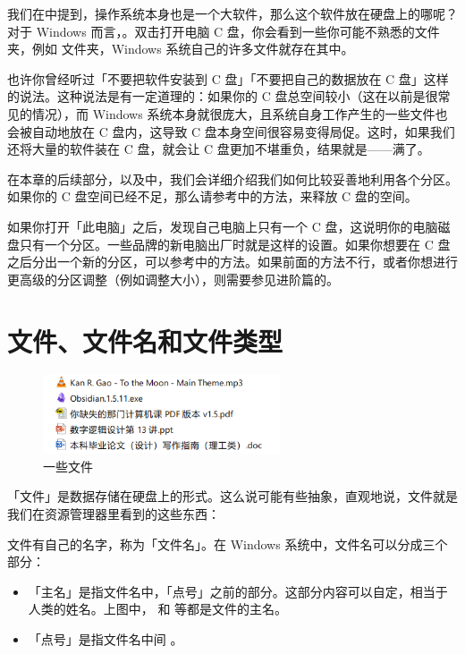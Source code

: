 我们在中提到，操作系统本身也是一个大软件，那么这个软件放在硬盘上的哪呢？对于 Windows 而言，。双击打开电脑 C 盘，你会看到一些你可能不熟悉的文件夹，例如  文件夹，Windows 系统自己的许多文件就存在其中。

也许你曾经听过「不要把软件安装到 C 盘」「不要把自己的数据放在 C 盘」这样的说法。这种说法是有一定道理的：如果你的 C 盘总空间较小（这在以前是很常见的情况），而 Windows 系统本身就很庞大，且系统自身工作产生的一些文件也会被自动地放在 C 盘内，这导致 C 盘本身空间很容易变得局促。这时，如果我们还将大量的软件装在 C 盘，就会让 C 盘更加不堪重负，结果就是——满了。

在本章的后续部分，以及中，我们会详细介绍我们如何比较妥善地利用各个分区。如果你的 C 盘空间已经不足，那么请参考中的方法，来释放 C 盘的空间。

\begin{note}
  如果你打开「此电脑」之后，发现自己电脑上只有一个 C 盘，这说明你的电脑磁盘只有一个分区。一些品牌的新电脑出厂时就是这样的设置。如果你想要在 C 盘之后分出一个新的分区，可以参考中的方法。如果前面的方法不行，或者你想进行更高级的分区调整（例如调整大小），则需要参见进阶篇的。
\end{note}

\section{文件、文件名和文件类型}

\begin{figure}
  \centering
  \includegraphics[width=7cm]{assets/basic/5_files.png}
  \caption{一些文件}
  \label{fig:5_files}
\end{figure}

「文件」是数据存储在硬盘上的形式。这么说可能有些抽象，直观地说，文件就是我们在资源管理器里看到的这些东西：

文件有自己的名字，称为「文件名」。在 Windows 系统中，文件名可以分成三个部分：

\begin{itemize}
  \item 「主名」是指文件名中，「点号」之前的部分。这部分内容可以自定，相当于人类的姓名。上图中， 和  等都是文件的主名。
  \item 「点号」是指文件名中间 。
\end{itemize}

